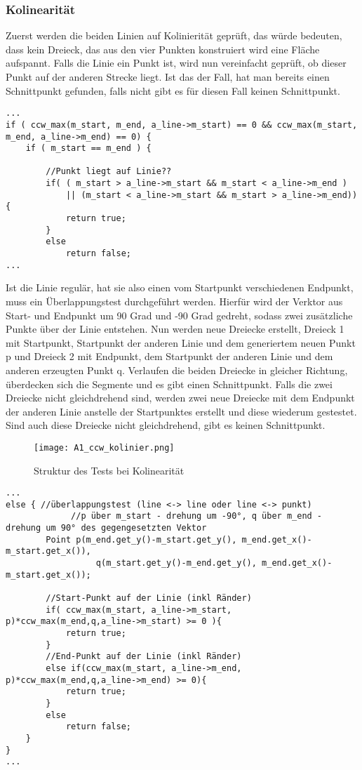 \subsubsection{Kolinearität}
Zuerst werden die beiden Linien auf Kolinierität geprüft, das würde bedeuten, dass kein Dreieck, das aus den vier Punkten konstruiert wird eine Fläche aufspannt.
Falls die Linie ein Punkt ist, wird nun vereinfacht geprüft, ob dieser Punkt auf der anderen Strecke liegt. Ist das der Fall, hat man bereits einen Schnittpunkt gefunden, falls nicht gibt es für diesen Fall keinen Schnittpunkt.
\begin{lstlisting}[captionpos=b, caption={Schnittpunkttest von kolinearen Linien - Sonderfall Punkt}, label=A1:SonderPunkt]
...
if ( ccw_max(m_start, m_end, a_line->m_start) == 0 && ccw_max(m_start, m_end, a_line->m_end) == 0) {
	if ( m_start == m_end ) {

		//Punkt liegt auf Linie??
		if( ( m_start > a_line->m_start && m_start < a_line->m_end )
			|| (m_start < a_line->m_start && m_start > a_line->m_end)){
			return true;
		}
		else
			return false;
...
\end{lstlisting}

Ist die Linie regulär, hat sie also einen vom Startpunkt verschiedenen Endpunkt, muss ein \"Uberlappungstest durchgeführt werden.
Hierfür wird der Verktor aus Start- und Endpunkt um 90 Grad und -90 Grad gedreht, sodass zwei zusätzliche Punkte über der Linie entstehen. Nun
werden neue Dreiecke erstellt, Dreieck 1 mit Startpunkt, Startpunkt der anderen Linie und dem generiertem neuen Punkt p und Dreieck 2 mit Endpunkt, dem Startpunkt der anderen Linie und dem anderen erzeugten Punkt q. Verlaufen die beiden Dreiecke in gleicher Richtung, überdecken sich die Segmente und es gibt einen Schnittpunkt. Falls die zwei Dreiecke nicht gleichdrehend sind, werden zwei neue Dreiecke mit dem Endpunkt der anderen Linie anstelle der Startpunktes erstellt und diese wiederum gestestet. Sind auch diese Dreiecke nicht gleichdrehend, gibt es keinen Schnittpunkt.

\begin{figure}[htb]
\centering
\texttt{[image: A1\_ccw\_kolinier.png]}
\caption{Struktur des Tests bei Kolinearität}
\label{fig:A1_kolinear}
\end{figure}

\begin{lstlisting}[captionpos=b, caption={Schnittpunkttest von kolinearen Linien }, label=A1:Kolinear]
...
else { //überlappungstest (line <-> line oder line <-> punkt)
			 //p über m_start - drehung um -90°, q über m_end - drehung um 90° des gegengesetzten Vektor
		Point p(m_end.get_y()-m_start.get_y(), m_end.get_x()-m_start.get_x()),
				  q(m_start.get_y()-m_end.get_y(), m_end.get_x()-m_start.get_x());

		//Start-Punkt auf der Linie (inkl Ränder)
		if( ccw_max(m_start, a_line->m_start, p)*ccw_max(m_end,q,a_line->m_start) >= 0 ){
			return true;
		}
		//End-Punkt auf der Linie (inkl Ränder)
		else if(ccw_max(m_start, a_line->m_end, p)*ccw_max(m_end,q,a_line->m_end) >= 0){
			return true;
		}
		else
			return false;
	}
}
...
\end{lstlisting}

